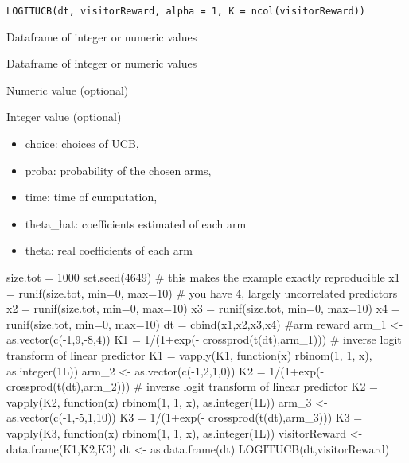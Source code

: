 \documentclass[letterpaper]{book}
\begin{document}
%
\begin{Usage}
\begin{verbatim}
LOGITUCB(dt, visitorReward, alpha = 1, K = ncol(visitorReward))
\end{verbatim}
\end{Usage}
%
\begin{Arguments}
\begin{ldescription}
\item[\code{dt}] Dataframe of integer or numeric values

\item[\code{visitorReward}] Dataframe of integer or numeric values

\item[\code{alpha}] Numeric value (optional)

\item[\code{K}] Integer value (optional)
\end{ldescription}
\end{Arguments}
%
\begin{Value}
\begin{itemize}
 List of element:
\item choice: choices of UCB,
\item proba: probability of the chosen arms,
\item time: time of cumputation,
\item theta\_hat: coefficients estimated of each arm
\item theta: real coefficients of each arm

\end{itemize}

\end{Value}
%
\begin{Examples}
\begin{ExampleCode}
size.tot = 1000
set.seed(4649)                          # this makes the example exactly reproducible
x1 = runif(size.tot, min=0, max=10)          # you have 4, largely uncorrelated predictors
x2 = runif(size.tot, min=0, max=10)
x3 = runif(size.tot, min=0, max=10)
x4 = runif(size.tot, min=0, max=10)
dt = cbind(x1,x2,x3,x4)
#arm reward
arm_1 <-  as.vector(c(-1,9,-8,4))
K1 = 1/(1+exp(- crossprod(t(dt),arm_1))) # inverse logit transform of linear predictor
K1 = vapply(K1, function(x) rbinom(1, 1, x), as.integer(1L))
arm_2 <-  as.vector(c(-1,2,1,0))
K2 = 1/(1+exp(- crossprod(t(dt),arm_2))) # inverse logit transform of linear predictor
K2 = vapply(K2, function(x) rbinom(1, 1, x), as.integer(1L))
arm_3 <-  as.vector(c(-1,-5,1,10))
K3 = 1/(1+exp(- crossprod(t(dt),arm_3)))
K3 = vapply(K3, function(x) rbinom(1, 1, x), as.integer(1L))
visitorReward <-  data.frame(K1,K2,K3)
dt <- as.data.frame(dt)
LOGITUCB(dt,visitorReward)
\end{ExampleCode}
\end{Examples}
\end{document}
